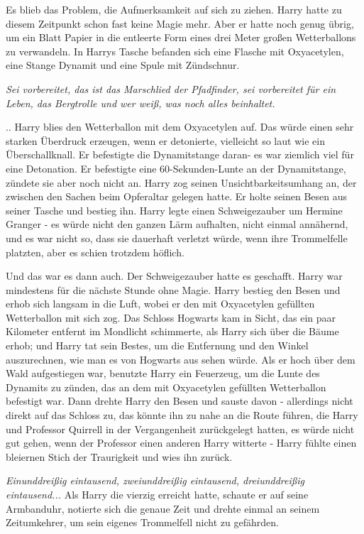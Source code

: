 Es blieb das Problem, die Aufmerksamkeit auf sich zu ziehen. Harry hatte zu
diesem Zeitpunkt schon fast keine Magie mehr. Aber er hatte noch genug übrig, um
ein Blatt Papier in die entleerte Form eines drei Meter großen Wetterballons zu
verwandeln. In Harrys Tasche befanden sich eine Flasche mit Oxyacetylen, eine
Stange Dynamit und eine Spule mit Zündschnur.

\emph{Sei vorbereitet, das ist das Marschlied der Pfadfinder, sei vorbereitet
für ein Leben, das Bergtrolle und wer weiß, was noch alles beinhaltet.}

.. Harry blies den Wetterballon mit dem Oxyacetylen auf. Das würde einen sehr
starken Überdruck erzeugen, wenn er detonierte, vielleicht so laut wie ein
Überschallknall. Er befestigte die Dynamitstange daran- es war ziemlich viel für
eine Detonation. Er befestigte eine 60-Sekunden-Lunte an der Dynamitstange,
zündete sie aber noch nicht an. Harry zog seinen Unsichtbarkeitsumhang an, der
zwischen den Sachen beim Opferaltar gelegen hatte. Er holte seinen Besen aus
seiner Tasche und bestieg ihn. Harry legte einen Schweigezauber um Hermine
Granger - es würde nicht den ganzen Lärm aufhalten, nicht einmal annähernd, und
es war nicht so, dass sie dauerhaft verletzt würde, wenn ihre Trommelfelle
platzten, aber es schien trotzdem höflich.

Und das war es dann auch. Der Schweigezauber hatte es geschafft. Harry war
mindestens für die nächste Stunde ohne Magie. Harry bestieg den Besen und erhob
sich langsam in die Luft, wobei er den mit Oxyacetylen gefüllten Wetterballon
mit sich zog. Das Schloss Hogwarts kam in Sicht, das ein paar Kilometer entfernt
im Mondlicht schimmerte, als Harry sich über die Bäume erhob; und Harry tat sein
Bestes, um die Entfernung und den Winkel auszurechnen, wie man es von Hogwarts
aus sehen würde. Als er hoch über dem Wald aufgestiegen war, benutzte Harry ein
Feuerzeug, um die Lunte des Dynamits zu zünden, das an dem mit Oxyacetylen
gefüllten Wetterballon befestigt war. Dann drehte Harry den Besen und sauste
davon - allerdings nicht direkt auf das Schloss zu, das könnte ihn zu nahe an
die Route führen, die Harry und Professor Quirrell in der Vergangenheit
zurückgelegt hatten, es würde nicht gut gehen, wenn der Professor einen anderen
Harry witterte - Harry fühlte einen bleiernen Stich der Traurigkeit und wies ihn
zurück.

\emph{Einunddreißig eintausend, zweiunddreißig eintausend, dreiunddreißig
eintausend...} Als Harry die vierzig erreicht hatte, schaute er auf seine
Armbanduhr, notierte sich die genaue Zeit und drehte einmal an seinem
Zeitumkehrer, um sein eigenes Trommelfell nicht zu gefährden.

